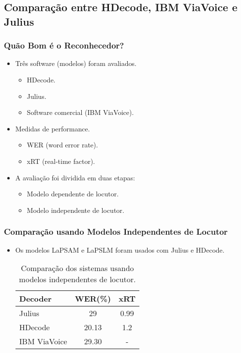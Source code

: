 \documentclass{beamer}
\begin{document}
\subsection[Comparação]{Comparação entre HDecode, IBM ViaVoice e Julius}
\begin{frame}
   \frametitle{Quão Bom é o Reconhecedor?}
   \begin{itemize}
      \item Três software (modelos) foram avaliados.
      \begin{itemize}
	 \item HDecode.
	 \item Julius.
	 \item Software comercial (IBM ViaVoice).
      \end{itemize}

      \item Medidas de performance.
      \begin{itemize}
	 \item WER (word error rate).
	 \item xRT (real-time factor).
      \end{itemize}

      \item A avaliação foi dividida em duas etapas:
      \begin{itemize}
	 \item Modelo dependente de locutor.
	 \item Modelo independente de locutor.
      \end{itemize}
   \end{itemize}
\end{frame}

\begin{frame}
   \frametitle{Comparação usando Modelos Independentes de Locutor}
   \begin{itemize}
      \item Os modelos LaPSAM e LaPSLM foram usados com Julius e HDecode.
      \begin{table}
	 \centering
	 \begin{tabular}{ l c c }
	    \toprule
	    \textbf{Decoder} & \textbf{WER(\%)} & \textbf{xRT} \\\midrule
	    Julius & 29 & 0.99 \\\midrule
	    HDecode & 20.13 & 1.2 \\\midrule
	    IBM ViaVoice & 29.30 & - \\
	     \bottomrule
	  \end{tabular}
	  \caption{Comparação dos sistemas usando modelos independentes de locutor.}
       \end{table}
    \end{itemize}
\end{frame}
\end{document}
